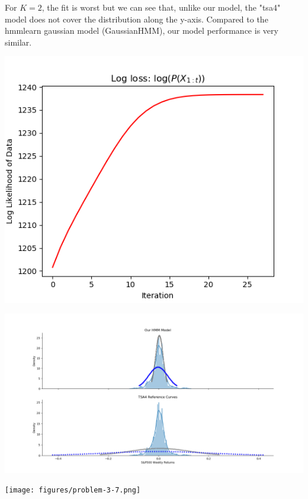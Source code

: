 \documentclass[12pt]{article}
\begin{document}
For $K=2$, the fit is worst but we can see that, unlike our model, the "tsa4" model does not cover the distribution along the y-axis. 
Compared to the hmmlearn gaussian model (GaussianHMM), our model performance is very similar.

\begin{center}
	\includegraphics[width=1\linewidth]{figures/problem-3-5.png} 
\end{center}

\begin{center}
	\includegraphics[width=1\linewidth]{figures/problem-3-6.png} 
\end{center}

\begin{center}
	\texttt{[image: figures/problem-3-7.png]} 
\end{center}
\end{document}
